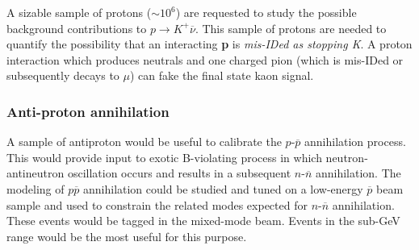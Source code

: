 
A sizable sample of protons ($\sim 10^6$)
are requested to study the possible background contributions to  $p \rightarrow K^+ \overline{\nu}$.
This sample of  protons are needed to quantify the possibility that an interacting {\bf p} 
is  {\em mis-IDed as stopping K}. A proton interaction which produces neutrals and one charged pion 
(which is mis-IDed or subsequently decays to $\mu$) can fake the final state kaon signal.


\subsubsection{Anti-proton annihilation }

A sample of antiproton would be useful to calibrate the $p$-$\overline{p}$ annihilation process. 
This would provide input to exotic B-violating process in which neutron-antineutron oscillation
occurs and results in a
subsequent  $n$-$\overline{n}$ annihilation. The modeling of $p\overline{p}$ annihilation could be
studied and tuned on a low-energy $\overline{p}$ beam sample and used to constrain the related modes 
expected for  $n$-$\overline{n}$ annihilation. These events would be tagged in the 
mixed-mode beam. Events in the sub-GeV range would be the most useful for this purpose.




